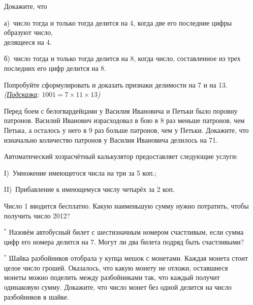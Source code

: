 
\begin{thm}Докажите, что
    \par
    а)~число тогда и только тогда делится на 4, когда две его последние цифры образуют число, \\ делящееся на 4.
    \par
    б)~число тогда и только тогда делится на 8, когда число, составленное из трех последних его цифр делится на 8.
\end{thm}

\begin{thm}
    Попробуйте сформулировать и доказать признаки делимости на 7 и на 13.
    \\ 
    {\footnotesize\textit{(\underline{Подсказка}: $1001=7\times11\times13$)}}
\end{thm}

\begin{thm}
    Перед боем с белогвардейцами у Василия Ивановича и Петьки было поровну патронов. Василий Иванович израсходовал в бою в 8 раз меньше патронов, чем Петька, а осталось у него в 9 раз больше патронов, чем у Петьки. Докажите, что изначально количество патронов у Василия Ивановича делилось на 71. 
\end{thm}

\begin{thm}
    Автоматический хозрасчётный калькулятор предоставляет следующие услуги:
    \par 
    I)~Умножение имеющегося числа на три за 5 коп.; 
    \par
    II)~Прибавление к имеющемуся числу четырёх за 2 коп. 
    \par
    Число 1 вводится бесплатно. Какую наименьшую сумму нужно потратить, чтобы получить число 2012?
\end{thm}

\begin{thm}$^{\ast}$
Назовём автобусный билет с шестизначным номером счастливым, если сумма цифр его номера делится на 7. Могут ли два билета подряд быть счастливыми?
\end{thm}

\begin{thm}$^{\ast}$
Шайка разбойников отобрала у купца мешок с монетами. Каждая монета стоит целое число грошей. Оказалось, что какую монету не отложи, оставшиеся монеты можно поделить между разбойниками так, что каждый получит одинаковую сумму. Докажите, что число монет без одной делится на число разбойников в шайке.
\end{thm}

